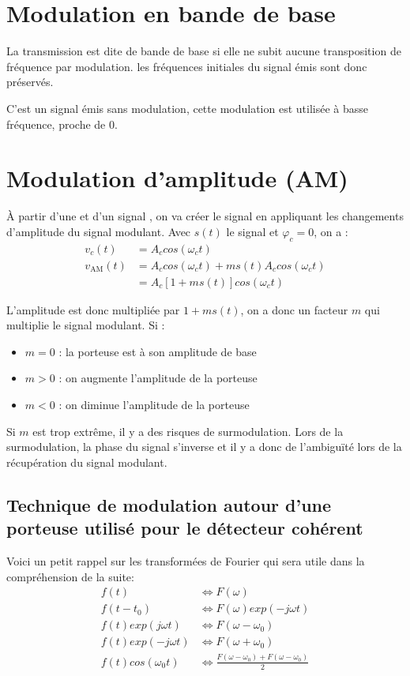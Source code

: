 \section{Modulation en bande de base}

La transmission est dite de bande de base si elle ne subit aucune transposition de fréquence par modulation. les fréquences initiales du signal émis sont donc préservés.

C'est un signal émis sans modulation, cette modulation est utilisée à basse fréquence, proche de 0.

\section{Modulation d'amplitude (AM)}

À partir d'une  et d'un signal , on va créer le signal  en appliquant les changements d'amplitude du signal modulant. Avec $s(t)$ le signal et $\varphi_c = 0$, on a :
\begin{align*}
v_c(t) &= A_c cos(\omega_c t)\\
v_{\text{AM}}(t) &= A_c cos(\omega_c t) + ms(t)A_c cos(\omega_c t)\\
	&= A_c[1 + ms(t)]cos(\omega_c t)
\end{align*}

L'amplitude est donc multipliée par $1+ms(t)$, on a donc un facteur $m$ qui multiplie le signal modulant. Si :
\begin{itemize}
\item $m = 0$ : la porteuse est à son amplitude de base
\item $m > 0$ : on augmente l'amplitude de la porteuse
\item $m < 0$ : on diminue l'amplitude de la porteuse
\end{itemize}
Si $m$ est trop extrême, il y a des risques de surmodulation. Lors de la surmodulation, la phase du signal s'inverse et il y a donc de l’ambiguïté lors de la récupération du signal modulant.

\subsection{Technique de modulation autour d'une porteuse utilisé pour le détecteur cohérent}

Voici un petit rappel sur les transformées de Fourier qui sera utile dans la compréhension de la suite:
\begin{align*}
f(t) &\Leftrightarrow F(\omega)\\
f(t-t_0) &\Leftrightarrow F(\omega)exp(-j\omega t)\\
f(t) exp(j\omega t) &\Leftrightarrow F(\omega-\omega_0)\\
f(t) exp(-j\omega t)&\Leftrightarrow F(\omega+\omega_0)\\
f(t) cos(\omega_0 t) &\Leftrightarrow \frac{F(\omega-\omega_0) +F(\omega-\omega_0)}{2}
\end{align*}

